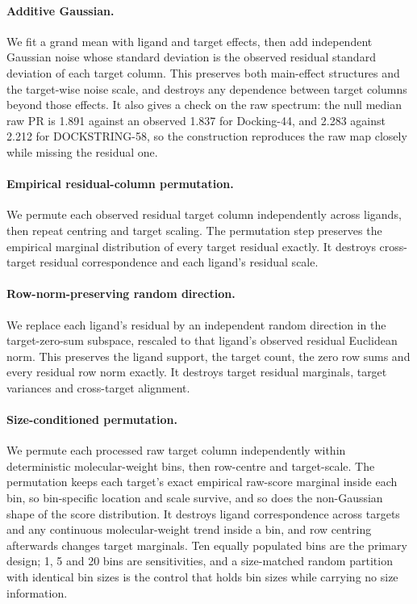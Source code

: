 \paragraph{Additive Gaussian.} We fit a grand mean with ligand and target effects, then add
independent Gaussian noise whose standard deviation is the observed residual standard deviation
of each target column. This preserves both main-effect structures and the target-wise noise
scale, and destroys any dependence between target columns beyond those effects. It also gives a
check on the raw spectrum: the null median raw PR is 1.891 against an observed 1.837 for
Docking-44, and 2.283 against 2.212 for DOCKSTRING-58, so the construction reproduces the raw
map closely while missing the residual one.

\paragraph{Empirical residual-column permutation.} We permute each observed residual target
column independently across ligands, then repeat centring and target scaling. The permutation
step preserves the empirical marginal distribution of every target residual exactly. It
destroys cross-target residual correspondence and each ligand's residual scale.

\paragraph{Row-norm-preserving random direction.} We replace each ligand's residual by an
independent random direction in the target-zero-sum subspace, rescaled to that ligand's
observed residual Euclidean norm. This preserves the ligand support, the target count, the zero
row sums and every residual row norm exactly. It destroys target residual marginals, target
variances and cross-target alignment.

\paragraph{Size-conditioned permutation.} We permute each processed raw target column
independently within deterministic molecular-weight bins, then row-centre and target-scale.
The permutation keeps each target's exact empirical raw-score marginal inside each bin, so
bin-specific location and scale survive, and so does the non-Gaussian shape of the score
distribution. It destroys ligand correspondence across targets and any continuous
molecular-weight trend inside a bin, and row centring afterwards changes target marginals. Ten
equally populated bins are the primary design; 1, 5 and 20 bins are sensitivities, and a
size-matched random partition with identical bin sizes is the control that holds bin sizes
while carrying no size information.

